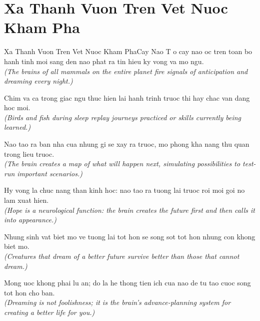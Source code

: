 \section{Xa Thanh Vuon Tren Vet Nuoc Kham Pha}
\begin{truyen}{Xa Thanh Vuon Tren Vet Nuoc Kham Pha}{Cay Nao}
T o cay nao oc tren toan bo hanh tinh moi sang den nao phat ra tin hieu ky vong va mo ngu.\\
\textit{(The brains of all mammals on the entire planet fire signals of anticipation and dreaming every night.)}

Chim va ca trong giac ngu thuc hien lai hanh trinh truoc thi hay chac van dang hoc moi.\\
\textit{(Birds and fish during sleep replay journeys practiced or skills currently being learned.)}

Nao tao ra ban nha cua nhung gi se xay ra truoc, mo phong kha nang thu quan trong lieu truoc.\\
\textit{(The brain creates a map of what will happen next, simulating possibilities to test-run important scenarios.)}

Hy vong la chuc nang than kinh hoc: nao tao ra tuong lai truoc roi moi goi no lam xuat hien.\\
\textit{(Hope is a neurological function: the brain creates the future first and then calls it into appearance.)}

Nhung sinh vat biet mo ve tuong lai tot hon se song sot tot hon nhung con khong biet mo.\\
\textit{(Creatures that dream of a better future survive better than those that cannot dream.)}

\end{truyen}
\begin{baihoc}
  Mong uoc khong phai lu an; do la he thong tien ich cua nao de tu tao cuoc song tot hon cho ban.\\
  \textit{(Dreaming is not foolishness; it is the brain's advance-planning system for creating a better life for you.)}
\end{baihoc}

